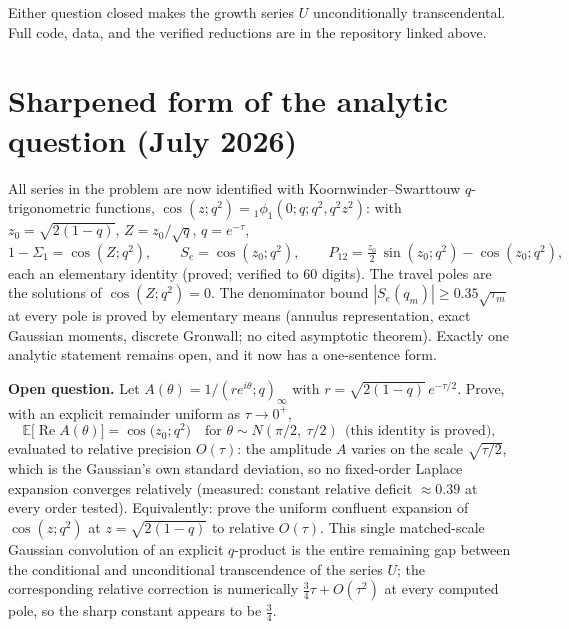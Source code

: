\documentclass[11pt]{article}
\begin{document}
Either question closed makes the growth series $U$ unconditionally transcendental. Full code, data,
and the verified reductions are in the repository linked above.


\section{Sharpened form of the analytic question (July 2026)}

All series in the problem are now identified with Koornwinder--Swarttouw $q$-trigonometric
functions, $\cos(z;q^2)={}_1\phi_1(0;q;q^2,q^2z^2)$: with $z_0=\sqrt{2(1-q)}$, $Z=z_0/\sqrt q$,
$q=e^{-\tau}$,
\[
 1-\Sigma_1=\cos(Z;q^2),\qquad S_e=\cos(z_0;q^2),\qquad
 P_{12}=\tfrac{z_0}2\,\sin(z_0;q^2)-\cos(z_0;q^2),
\]
each an elementary identity (proved; verified to $60$ digits). The travel poles are the solutions of
$\cos(Z;q^2)=0$. The denominator bound $|S_e(q_m)|\ge0.35\sqrt{\tau_m}$ at every pole is proved by
elementary means (annulus representation, exact Gaussian moments, discrete Gronwall; no cited
asymptotic theorem). Exactly one analytic statement remains open, and it now has a one-sentence
form.

\medskip\noindent\textbf{Open question.} Let $A(\theta)=1/(re^{i\theta};q)_\infty$ with
$r=\sqrt{2(1-q)}\,e^{-\tau/2}$. Prove, with an explicit remainder uniform as $\tau\to0^+$,
\[
 \mathbb{E}\bigl[\operatorname{Re}A(\theta)\bigr]
 =\cos\bigl(z_0;q^2\bigr)\quad\text{for }\theta\sim N(\pi/2,\ \tau/2)
 \ \ \text{(this identity is proved)},
\]
evaluated to relative precision $O(\tau)$: the amplitude $A$ varies on the scale
$\sqrt{\tau/2}$, which is the Gaussian's own standard deviation, so no fixed-order Laplace
expansion converges relatively (measured: constant relative deficit $\approx0.39$ at every order
tested). Equivalently: prove the uniform confluent expansion of $\cos(z;q^2)$ at
$z=\sqrt{2(1-q)}$ to relative $O(\tau)$. This single matched-scale Gaussian convolution of an
explicit $q$-product is the entire remaining gap between the conditional and unconditional
transcendence of the series $U$; the corresponding relative correction is numerically
$\tfrac34\tau+O(\tau^2)$ at every computed pole, so the sharp constant appears to be
$\tfrac34$.
\end{document}
